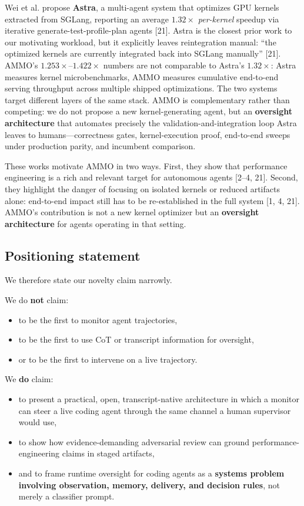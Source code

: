 \documentclass[11pt]{article}
\begin{document}
Wei et al. propose \textbf{Astra}, a multi-agent system that optimizes GPU kernels extracted from SGLang, reporting an average $1.32\times$ \emph{per-kernel} speedup via iterative generate-test-profile-plan agents [21]. Astra is the closest prior work to our motivating workload, but it explicitly leaves reintegration manual: ``the optimized kernels are currently integrated back into SGLang manually'' [21]. AMMO's $1.253\times$--$1.422\times$ numbers are not comparable to Astra's $1.32\times$: Astra measures kernel microbenchmarks, AMMO measures cumulative end-to-end serving throughput across multiple shipped optimizations. The two systems target different layers of the same stack. AMMO is complementary rather than competing: we do not propose a new kernel-generating agent, but an \textbf{oversight architecture} that automates precisely the validation-and-integration loop Astra leaves to humans---correctness gates, kernel-execution proof, end-to-end sweeps under production parity, and incumbent comparison.

These works motivate AMMO in two ways. First, they show that performance engineering is a rich and relevant target for autonomous agents [2--4, 21]. Second, they highlight the danger of focusing on isolated kernels or reduced artifacts alone: end-to-end impact still has to be re-established in the full system [1, 4, 21]. AMMO's contribution is not a new kernel optimizer but an \textbf{oversight architecture} for agents operating in that setting.

\subsection{Positioning statement}

We therefore state our novelty claim narrowly.

We do \textbf{not} claim:
\begin{itemize}[leftmargin=*,itemsep=2pt]
  \item to be the first to monitor agent trajectories,
  \item to be the first to use CoT or transcript information for oversight,
  \item or to be the first to intervene on a live trajectory.
\end{itemize}

We \textbf{do} claim:
\begin{itemize}[leftmargin=*,itemsep=2pt]
  \item to present a practical, open, transcript-native architecture in which a monitor can steer a live coding agent through the same channel a human supervisor would use,
  \item to show how evidence-demanding adversarial review can ground performance-engineering claims in staged artifacts,
  \item and to frame runtime oversight for coding agents as a \textbf{systems problem involving observation, memory, delivery, and decision rules}, not merely a classifier prompt.
\end{itemize}
\end{document}
